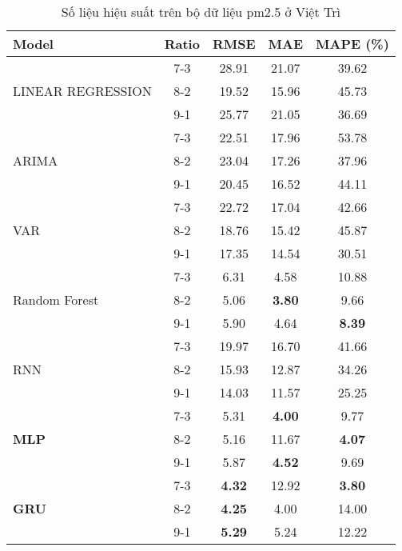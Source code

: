 \begin{table}[h!]
    \centering
    \caption{Số liệu hiệu suất trên bộ dữ liệu pm2.5 ở Việt Trì}
    \begin{tabular}{|l|c|c|c|c|}
    \hline
    \rowcolor{orange!30} \textbf{Model} & \textbf{Ratio} & \textbf{RMSE} & \textbf{MAE} & \textbf{MAPE (\%)} \\ \hline
    \rowcolor{white}  & 7-3 & 28.91 & 21.07 & 39.62 \\ 
    \rowcolor{white}  LINEAR REGRESSION & 8-2 & 19.52 & 15.96 & 45.73 \\ 
    \rowcolor{white}  & 9-1 & 25.77 & 21.05 & 36.69 \\ \hline
    \rowcolor{white}  & 7-3 & 22.51 & 17.96 & 53.78 \\ 
    \rowcolor{white} ARIMA & 8-2 & 23.04 & 17.26 & 37.96 \\
    \rowcolor{white}  & 9-1 & 20.45 & 16.52 & 44.11 \\ \hline
    \rowcolor{white}  & 7-3 & 22.72 & 17.04 & 42.66 \\ 
    \rowcolor{white} VAR & 8-2 & 18.76 & 15.42 & 45.87 \\ 
    \rowcolor{white}  & 9-1 & 17.35 & 14.54 & 30.51 \\ \hline
    \rowcolor{white} & 7-3 & 6.31 & 4.58 & 10.88 \\ 
    \rowcolor{white} Random Forest & 8-2 & 5.06 & \textbf{3.80} & 9.66 \\ 
    \rowcolor{white} & 9-1 & 5.90 & 4.64 & \textbf{8.39} \\ \hline
    \rowcolor{white}  & 7-3 & 19.97 & 16.70 & 41.66 \\ 
    \rowcolor{white} RNN & 8-2 & 15.93 & 12.87 & 34.26 \\ 
    \rowcolor{white}  & 9-1 & 14.03 & 11.57 & 25.25 \\ \hline
    \rowcolor{white} & 7-3 & 5.31 & \textbf{4.00} & 9.77 \\ 
    \rowcolor{white} \textbf{MLP}  & 8-2 & 5.16 & 11.67  & \textbf{4.07} \\ 
    \rowcolor{white}  & 9-1 & 5.87 & \textbf{4.52} & 9.69 \\ \hline
    \rowcolor{white} & 7-3 & \textbf{4.32} & 12.92 & \textbf{3.80} \\ 
    \rowcolor{white} \textbf{GRU}   & 8-2 & \textbf{4.25} & 4.00 & 14.00 \\ 
    \rowcolor{white}  & 9-1 & \textbf{5.29} & 5.24 & 12.22 \\ \hline

\end{tabular}
\end{table}
